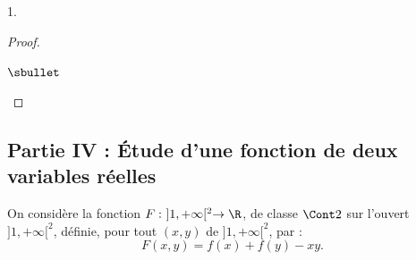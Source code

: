 \documentclass[11pt]{article}%
\begin{document}
\begin{noliste}{1.}
\begin{proof}
\begin{noliste}{$\sbullet$}
~\\[-1.4cm]
\end{noliste}
\end{proof}
\end{noliste}

\newpage

\subsection*{Partie IV : Étude d'une fonction de deux variables
  réelles}

\noindent
On considère la fonction $F: \ ]1,+\infty[^2 \rightarrow \R$, de classe 
$\Cont 2$ sur l'ouvert $]1,+\infty[^2$, définie, pour tout $(x,y)$ de 
$]1,+\infty[^2$, par :
\[
F(x,y)=f(x)+f(y)-xy.
\]
\end{document}
